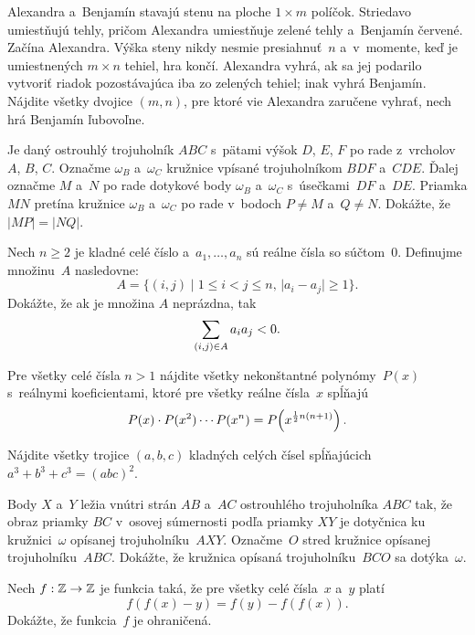 {%
 Alexandra a~Benjamín stavajú stenu na ploche $1 \times m$ políčok. Striedavo umiestňujú tehly, pričom Alexandra umiestňuje zelené tehly a~Benjamín červené. Začína Alexandra. Výška steny nikdy nesmie presiahnuť~$n$ a~v~momente, keď je umiestnených $m \times n$ tehiel, hra končí. Alexandra vyhrá, ak sa jej podarilo vytvoriť riadok pozostávajúca iba zo zelených tehiel; inak vyhrá Benjamín. Nájdite všetky dvojice $(m, n)$, pre ktoré vie Alexandra zaručene vyhrať, nech hrá Benjamín ľubovoľne.}

{%
 Je daný ostrouhlý trojuholník $ABC$ s~pätami výšok $D$, $E$, $F$ po rade z~vrcholov $A$, $B$, $C$. Označme $\omega_B$ a~$\omega_C$ kružnice vpísané trojuholníkom $BDF$ a~$CDE$. Ďalej označme $M$ a~$N$ po rade dotykové body $\omega_B$ a~$\omega_C$ s~úsečkami~$DF$ a~$DE$. Priamka $MN$ pretína kružnice $\omega_B$ a~$\omega_C$ po rade v~bodoch $P \ne M$ a~$Q \ne N$. Dokážte, že $|MP|=|NQ|$.}

{%
 Nech $n \ge 2$ je kladné celé číslo a~$a_1,\ldots,a_n$ sú reálne čísla so súčtom~0. Definujme množinu~$A$ nasledovne:
$$
A=\{(i,j)\;|\;1 \leq i < j \leq n,\,|a_i-a_j|\ge 1\}.
$$
Dokážte, že ak je množina $A$ neprázdna, tak
$$
\sum_{(i,j)\in A} a_i a_j < 0.
\belowdisplayskip0pt
$$}

{%
 Pre všetky celé čísla $n>1$ nájdite všetky nekonštantné polynómy~$P(x)$ s~reálnymi koeficientami, ktoré pre všetky reálne čísla~$x$ spĺňajú
$$
P(x)\cdot P(x^2) \cdots P(x^n) = P\!\left(x^{\frac12n(n+1)}\right).
\belowdisplayskip0pt
$$}

{%
 Nájdite všetky trojice $(a,b,c)$ kladných celých čísel spĺňajúcich $a^3+b^3+c^3=(abc)^2$.}

{%
 Body $X$ a~$Y$ ležia vnútri strán $AB$ a~$AC$ ostrouhlého trojuholníka $ABC$ tak, že obraz priamky $BC$ v~osovej súmernosti podľa priamky $XY$ je dotyčnica ku kružnici~$\omega$ opísanej trojuholníku~$AXY$. Označme~$O$ stred kružnice opísanej trojuholníku~$ABC$. Dokážte, že kružnica opísaná trojuholníku~$BCO$ sa dotýka~$\omega$.}

{%
 Nech $f : {\Bbb Z} \to {\Bbb Z}$ je funkcia taká, že pre všetky celé čísla~$x$ a~$y$ platí
$$
f(f(x)-y)=f(y)-f(f(x)).
$$
Dokážte, že funkcia~$f$ je ohraničená.}

